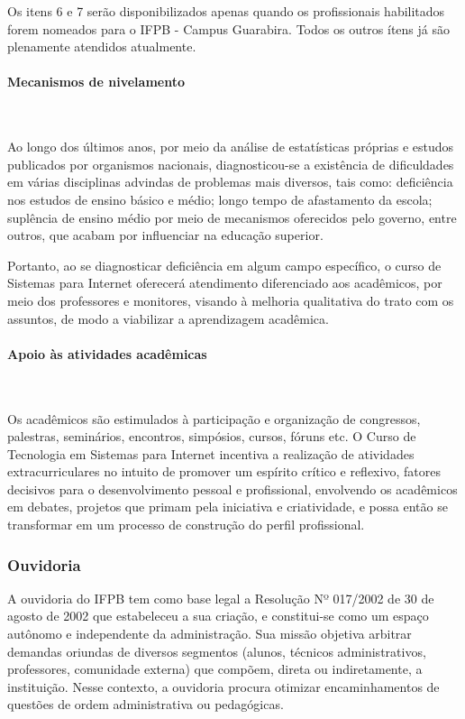 	Os itens 6 e 7 ser\~ao disponibilizados apenas quando os profissionais habilitados forem nomeados para o IFPB - Campus Guarabira. Todos os outros \'itens j\'a s\~ao plenamente atendidos atualmente.

\paragraph{Mecanismos de nivelamento}\

Ao longo dos últimos anos, por meio da análise de estatísticas próprias e estudos publicados por organismos nacionais, diagnosticou-se a existência de dificuldades em várias disciplinas advindas de problemas mais diversos, tais como: deficiência nos estudos de ensino básico e médio; longo tempo de afastamento da escola; suplência de ensino médio por meio de mecanismos oferecidos pelo governo, entre outros, que acabam por influenciar na educação superior.

Portanto, ao se diagnosticar deficiência em algum campo específico, o curso de Sistemas para Internet oferecer\'a atendimento diferenciado aos acadêmicos, por meio dos professores e monitores, visando à melhoria qualitativa do trato com os assuntos, de modo a viabilizar a aprendizagem acadêmica.

\paragraph{Apoio \`as atividades acad\^emicas}\

Os acadêmicos são estimulados \`a participação e organização de congressos, palestras, seminários, encontros, simpósios, cursos, fóruns etc. O Curso de Tecnologia em Sistemas para Internet incentiva a realização de atividades extracurriculares no intuito de promover um espírito crítico e reflexivo, fatores decisivos para o desenvolvimento pessoal e profissional, envolvendo os acadêmicos em debates, projetos que primam pela iniciativa e criatividade, e possa então se transformar em um processo de construção do perfil profissional.

\subsubsection{Ouvidoria}
       
A ouvidoria do IFPB tem como base legal a Resolução Nº 017/2002 de 30 de agosto de 2002 que estabeleceu a sua criação, e constitui-se como um espaço autônomo e independente da administração.  Sua missão objetiva arbitrar demandas oriundas de diversos segmentos (alunos, técnicos administrativos, professores, comunidade externa) que compõem, direta ou indiretamente, a instituição. Nesse contexto, a ouvidoria procura otimizar encaminhamentos de questões de ordem administrativa ou pedagógicas. 

